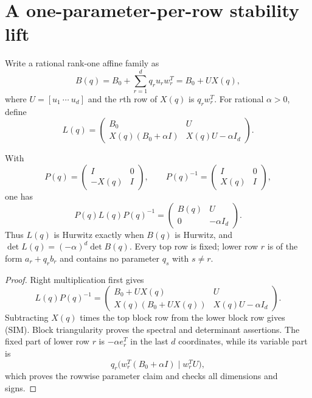 \section{A one-parameter-per-row stability lift}
\label{sec:row-splitting-independent}

Write a rational rank-one affine family as
\[
 B(q)=B_0+\sum_{r=1}^{d}q_ru_rw_r^T=B_0+U X(q),
\]
where $U=[u_1\ \cdots\ u_d]$ and the $r$th row of $X(q)$ is $q_rw_r^T$.
For rational $\alpha>0$, define
\[
 L(q)=\begin{pmatrix}
 B_0&U\\
 X(q)(B_0+\alpha I)&X(q)U-\alpha I_d
 \end{pmatrix}.
 \tag{SL}
\]

\begin{lemma}
\label{lem:row-splitting-independent}
With
\[
 P(q)=\begin{pmatrix}I&0\\-X(q)&I\end{pmatrix},\qquad
 P(q)^{-1}=\begin{pmatrix}I&0\\X(q)&I\end{pmatrix},
\]
one has
\[
 P(q)L(q)P(q)^{-1}
 =\begin{pmatrix}B(q)&U\\0&-\alpha I_d\end{pmatrix}.
 \tag{SIM}
\]
Thus $L(q)$ is Hurwitz exactly when $B(q)$ is Hurwitz, and
$\det L(q)=(-\alpha)^d\det B(q)$. Every top row is fixed; lower row $r$ is
of the form $a_r+q_rb_r$ and contains no parameter $q_s$ with $s\ne r$.
\end{lemma}

\begin{proof}
Right multiplication first gives
\[
 L(q)P(q)^{-1}
 =\begin{pmatrix}
 B_0+UX(q)&U\\
 X(q)(B_0+UX(q))&X(q)U-\alpha I_d
 \end{pmatrix}.
\]
Subtracting $X(q)$ times the top block row from the lower block row gives
(SIM). Block triangularity proves the spectral and determinant assertions.
The fixed part of lower row $r$ is $-\alpha e_r^T$ in the last $d$
coordinates, while its variable part is
\[
 q_r\bigl(w_r^T(B_0+\alpha I)\mid w_r^TU\bigr),
\]
which proves the rowwise parameter claim and checks all dimensions and signs.
\end{proof}
